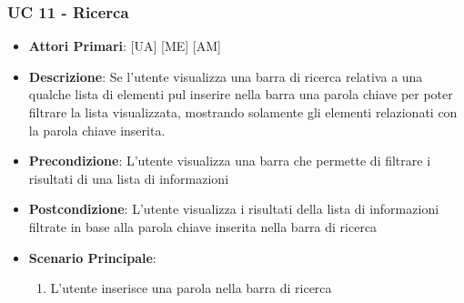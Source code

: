 		\subsubsection{UC 11 - Ricerca}
			\begin{itemize}
				\item \textbf{Attori Primari}: [UA] [ME] [AM]
				\item \textbf{Descrizione}: Se l'utente visualizza una barra di ricerca relativa a una qualche lista di elementi pul inserire nella barra una parola chiave per poter filtrare la lista visualizzata, mostrando solamente gli elementi relazionati con la parola chiave inserita.
				\item \textbf{Precondizione}: L'utente visualizza una barra che permette di filtrare i risultati di una lista di informazioni
				\item \textbf{Postcondizione}: L'utente visualizza i risultati della lista di informazioni filtrate in base alla parola chiave inserita nella barra di ricerca
				\item \textbf{Scenario Principale}:
				\begin{enumerate}
					\item{L'utente inserisce una parola nella barra di ricerca}
				\end{enumerate}	
			\end{itemize}
	

















